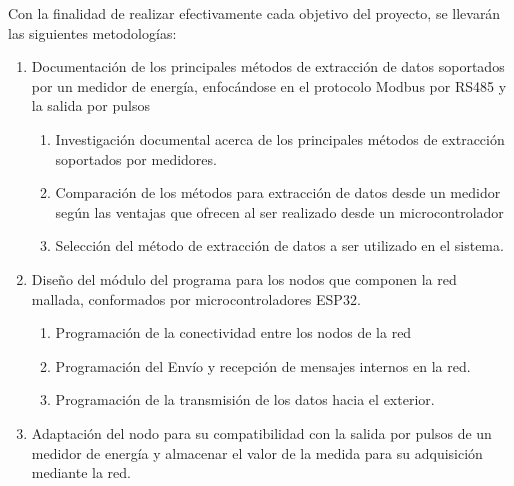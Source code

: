 \documentclass[12pt,letterpaper]{article}
\begin{document}
\vspace{1cm}

Con la finalidad de realizar efectivamente cada objetivo del proyecto, se llevarán las siguientes metodologías:
\bigskip

\begin{enumerate}[1.]
	
	
	
	\item Documentación de los principales métodos de extracción de datos soportados por un medidor de energía, enfocándose en el protocolo Modbus por RS485 y la salida por pulsos
	
		\begin{enumerate}
		
		\item Investigación documental acerca de los principales métodos de extracción soportados por medidores. 
		
		\item Comparación de los métodos para extracción de datos desde un medidor según las ventajas que ofrecen al ser realizado desde un microcontrolador
		
		\item Selección del método de extracción de datos a ser utilizado en el sistema.
		
		
	\end{enumerate}
	
	\item  Diseño del módulo del programa para los nodos que componen la red mallada, conformados por microcontroladores ESP32.
	
	
	\begin{enumerate}
		
		\item Programación de la conectividad entre los nodos de la red
		
		\item Programación del Envío y recepción de mensajes internos en la red.
		
		\item Programación de la transmisión de los datos hacia el exterior.
		
		
		
	\end{enumerate}
	
	
	\item Adaptación del nodo para su compatibilidad con la salida por pulsos de un medidor de energía y almacenar el valor de la medida para su adquisición mediante la red.
	

\end{enumerate}
\end{document}
